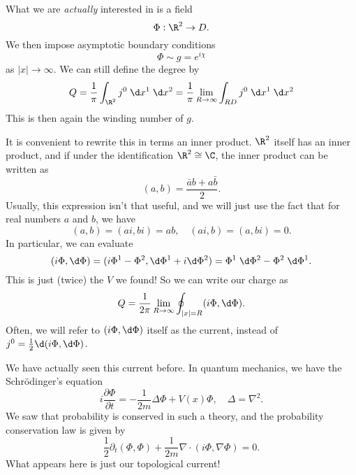 \documentclass[a4paper]{article}
\begin{document}
What we are \emph{actually} interested in is a field
\[
  \Phi: \R^2 \to D.
\]
We then impose asymptotic boundary conditions
\[
  \Phi \sim g = e^{i\chi}
\]
as $|x| \to \infty$. We can still define the degree by
\[
  Q = \frac{1}{\pi} \int_{\R^2} j^0 \;\d x^1 \;\d x^2 = \frac{1}{\pi} \lim_{R \to \infty}\int_{RD} j^0 \;\d x^1 \;\d x^2
\]
This is then again the winding number of $g$.

It is convenient to rewrite this in terms an inner product. $\R^2$ itself has an inner product, and if under the identification $\R^2 \cong \C$, the inner product can be written as
\[
  (a, b) = \frac{\bar{a} b + a \bar{b}}{2}.
\]
Usually, this expression isn't that useful, and we will just use the fact that for real numbers $a$ and $b$, we have
\[
  (a, b) = (ai, bi) =  ab, \quad (ai, b) = (a, bi) = 0.
\]
In particular, we can evaluate
\[
  (i \Phi, \d \Phi) = (i \Phi^1 - \Phi^2, \d \Phi^1 + i \d \Phi^2) = \Phi^1\;\d \Phi^2 - \Phi^2\;\d \Phi^1.
\]
This is just (twice) the $V$ we found! So we can write our charge as
\[
  Q = \frac{1}{2\pi} \lim_{R \to \infty} \oint_{|x| = R} (i \Phi, \d \Phi).
\]
Often, we will refer to $(i \Phi, \d \Phi)$ itself as the current, instead of $j^0 = \frac{1}{2} \d (i \Phi, \d \Phi)$.


We have actually seen this current before. In quantum mechanics, we have the Schr\"odinger's equation
\[
  i \frac{\partial \Phi}{\partial t} = - \frac{1}{2m} \Delta \Phi + V(x) \Phi,\quad \Delta = \nabla^2.
\]
We saw that probability is conserved in such a theory, and the probability conservation law is given by
\[
  \frac{1}{2} \partial_t (\Phi, \Phi) + \frac{1}{2m} \nabla \cdot (i \Phi, \nabla \Phi) = 0.
\]
What appears here is just our topological current!
\end{document}
